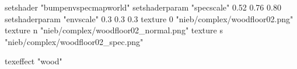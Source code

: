 setshader "bumpenvspecmapworld"
setshaderparam "specscale" 0.52 0.76 0.80
setshaderparam "envscale"  0.3 0.3 0.3
   texture 0 "nieb/complex/woodfloor02.png"
   texture n "nieb/complex/woodfloor02_normal.png"
   texture s "nieb/complex/woodfloor02_spec.png"

texeffect "wood"
